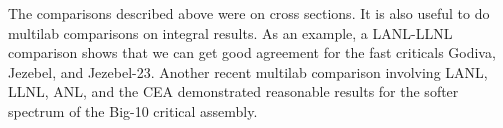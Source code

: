 The comparisons described above were on cross sections.  It is also
useful to do multilab comparisons on integral results.  As an example,
a LANL-LLNL comparison\cite{fast} shows that we can get good
agreement for the fast criticals Godiva, Jezebel, and Jezebel-23.
Another recent multilab comparison involving LANL, LLNL, ANL, and
the CEA demonstrated reasonable results for the softer spectrum of
the Big-10 critical assembly\cite{big10}.

\cleardoublepage


